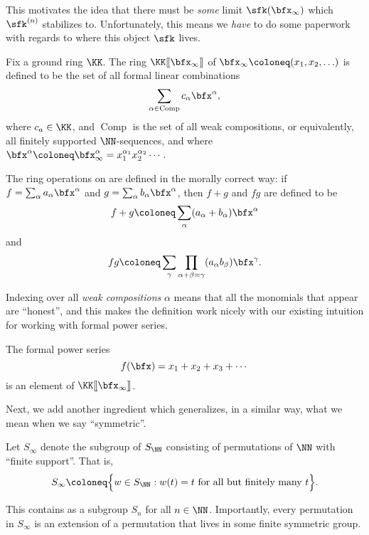 \documentclass{article}
\newcommand{\fps}[2]{#1 [\kern-1.2pt[ {#2} ]\kern-1.2pt]}
\DeclareMathOperator{\Com}{Comp}
\begin{document}
This motivates the idea that there must be \textit{some} limit $\sfk(\bfx_\infty)$ which $\sfk^{(n)}$ stabilizes to.
Unfortunately, this means we \textit{have} to do some paperwork with regards to where this object $\sfk$ lives.

\begin{definition}
    Fix a ground ring $\KK$.
    The ring $\fps{\KK}{\bfx_\infty}$ of  $\bfx_\infty \coloneq (x_1, x_2, \ldots)$ is defined to be the set of all formal linear combinations 
    \[
        \sum_{\alpha\in\Com} c_\alpha \bfx^\alpha,
    \]
    where $c_a \in \KK$, and $\Com$ is the set of all weak compositions, or equivalently, all finitely supported $\NN$-sequences, and where $\bfx^\alpha \coloneq \bfx_\infty^\alpha = x_1^{\alpha_1}x_2^{\alpha_2}\cdots$.

    The ring operations on are defined in the morally correct way:
    if $f = \sum_\alpha a_\alpha \bfx^\alpha$ and $g = \sum_\alpha b_\alpha \bfx^\alpha$, then $f + g$ and $fg$ are defined to be
    \[
        f+g
        \coloneq
        \sum_\alpha
        (a_\alpha+b_\alpha)\bfx^\alpha
    \]
    and
    \[
        fg
        \coloneq
        \sum_\gamma \prod_{\alpha+\beta=\gamma}
        (a_\alpha b_\beta) \bfx^\gamma.
    \]
\end{definition}

Indexing over all \textit{weak compositions} $\alpha$ means that all the monomials that appear are ``honest'', and this makes the definition work nicely with our existing intuition for working with formal power series.

\begin{example}
    The formal power series
    \[
        f(\bfx)
        =
        x_1 + x_2 + x_3 + \cdots
    \]
    is an element of $\fps{\KK}{\bfx_\infty}$.
\end{example}

Next, we add another ingredient which generalizes, in a similar way, what we mean when we say ``symmetric''.

\begin{definition}
    Let $S_\infty$ denote the subgroup of $S_\NN$ consisting of permutations of $\NN$ with ``finite support''.
    That is,
    \[
        S_\infty
        \coloneq
        \Big\{
            w \in S_\NN: w(t) = t\text{ for all but finitely many }t
        \Big\}.
    \]
\end{definition}

This contains as a subgroup $S_n$ for all $n \in \NN$.
Importantly, every permutation in $S_\infty$ is an extension of a permutation that lives in some finite symmetric group.
\end{document}
